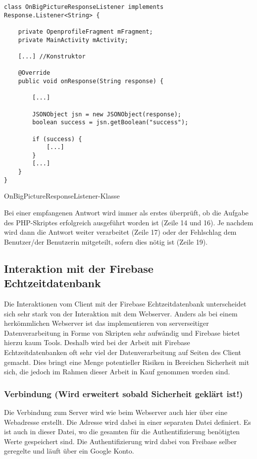 \documentclass[../main.tex]{subfiles}
\begin{document}
\begin{code}
	\begin{center}
		\begin{verbatim}
class OnBigPictureResponseListener implements Response.Listener<String> {

	private OpenprofileFragment mFragment;
	private MainActivity mActivity;

	[...] //Konstruktor

	@Override
	public void onResponse(String response) {
		
		[...]

		JSONObject jsn = new JSONObject(response);
		boolean success = jsn.getBoolean("success");

		if (success) {
			[...]
		}
		[...]
	}
}
		\end{verbatim}
		\caption{OnBigPictureResponseListener-Klasse}
		\label{OnResponseListener}
	\end{center}
\end{code}		
	
	Bei einer empfangenen Antwort wird immer als erstes überprüft, ob die Aufgabe des PHP-Skriptes erfolgreich ausgeführt worden ist (Zeile 14 und 16). Je nachdem wird dann die Antwort weiter verarbeitet (Zeile 17) oder der Fehlschlag dem Benutzer/der Benutzerin mitgeteilt, sofern dies nötig ist (Zeile 19).
	
	\subsection{Interaktion mit der Firebase Echtzeitdatenbank}
	Die Interaktionen vom Client mit der Firebase Echtzeitdatenbank unterscheidet sich sehr stark von der Interaktion mit dem Webserver. Anders als bei einem herkömmlichen Webserver ist das implementieren von serverseitiger Datenverarbeitung in Forme von Skripten sehr aufwändig und Firebase bietet hierzu kaum Tools. Deshalb wird bei der Arbeit mit Firebase Echtzeitdatenbanken oft sehr viel der Datenverarbeitung auf Seiten des Client gemacht. Dies bringt eine Menge potentieller Risiken in Bereichen Sicherheit mit sich, die jedoch im Rahmen dieser Arbeit in Kauf genommen worden sind. 
	
	\subsubsection{Verbindung (Wird erweitert sobald Sicherheit geklärt ist!)}
	Die Verbindung zum Server wird wie beim Webserver auch hier über eine Webadresse erstellt. Die Adresse wird dabei in einer separaten Datei definiert. Es ist auch in dieser Datei, wo die gesamten für die Authentifizierung benötigten Werte gespeichert sind. Die Authentifizierung wird dabei von Freibase selber geregelte und läuft über ein Google Konto.
	
\end{document}
